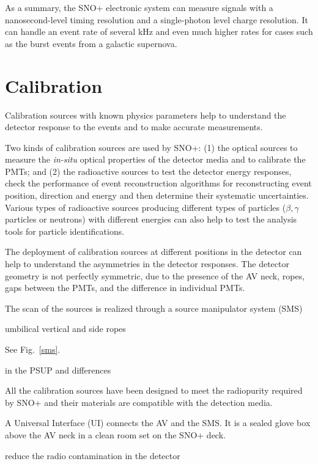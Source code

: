 As a summary, the SNO+ electronic system can measure signals with a nanosecond-level timing resolution and a single-photon level charge resolution. It can handle an event rate of several kHz and even much higher rates for cases such as the burst events from a galactic supernova\cite{snop_jinst}.

\section{Calibration}\label{sect:calibr}
Calibration sources with known physics parameters help to understand the detector response to the events and to make accurate measurements.

Two kinds of calibration sources are used by SNO+: (1) the optical sources to measure the \emph{in-situ} optical properties of the detector media and to calibrate the PMTs; and (2) the radioactive sources to test the detector energy responses, check the performance of event reconstruction algorithms for reconstructing event position, direction and energy and then determine their systematic uncertainties. Various types of radioactive sources producing different types of particles ($\beta,\gamma$ particles or neutrons) with different energies can also help to test the analysis tools for particle identifications.

The deployment of calibration sources at different positions in the detector can help to understand the asymmetries in the detector responses. The detector geometry is not perfectly symmetric, due to the presence of the AV neck, ropes, gaps between the PMTs, and the difference in individual PMTs\cite{snop_jinst}. 

The scan of the sources is realized through a source manipulator system (SMS)

umbilical vertical and side ropes

See Fig.~\ref{sms}.

 in the PSUP and differences    

All the calibration sources have been designed to meet the radiopurity required by SNO+ and their materials are compatible with the detection media\cite{snop_jinst}.


A Universal Interface (UI) connects the AV and the SMS. It is a sealed glove
box above the AV neck in a clean room set on the SNO+ deck.


reduce the radio contamination in the detector

